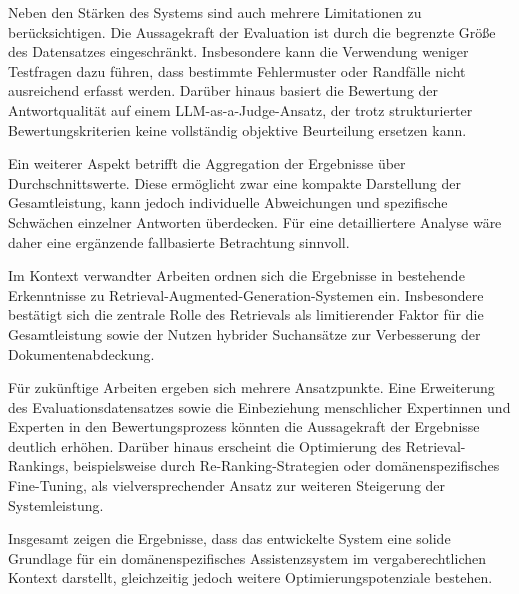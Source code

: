 Neben den Stärken des Systems sind auch mehrere Limitationen zu berücksichtigen. Die Aussagekraft der Evaluation ist durch die begrenzte Größe des Datensatzes eingeschränkt. Insbesondere kann die Verwendung weniger Testfragen dazu führen, dass bestimmte Fehlermuster oder Randfälle nicht ausreichend erfasst werden. Darüber hinaus basiert die Bewertung der Antwortqualität auf einem LLM-as-a-Judge-Ansatz, der trotz strukturierter Bewertungskriterien keine vollständig objektive Beurteilung ersetzen kann.

Ein weiterer Aspekt betrifft die Aggregation der Ergebnisse über Durchschnittswerte. Diese ermöglicht zwar eine kompakte Darstellung der Gesamtleistung, kann jedoch individuelle Abweichungen und spezifische Schwächen einzelner Antworten überdecken. Für eine detailliertere Analyse wäre daher eine ergänzende fallbasierte Betrachtung sinnvoll.

Im Kontext verwandter Arbeiten ordnen sich die Ergebnisse in bestehende Erkenntnisse zu Retrieval-Augmented-Generation-Systemen ein. Insbesondere bestätigt sich die zentrale Rolle des Retrievals als limitierender Faktor für die Gesamtleistung sowie der Nutzen hybrider Suchansätze zur Verbesserung der Dokumentenabdeckung.

Für zukünftige Arbeiten ergeben sich mehrere Ansatzpunkte. Eine Erweiterung des Evaluationsdatensatzes sowie die Einbeziehung menschlicher Expertinnen und Experten in den Bewertungsprozess könnten die Aussagekraft der Ergebnisse deutlich erhöhen. Darüber hinaus erscheint die Optimierung des Retrieval-Rankings, beispielsweise durch Re-Ranking-Strategien oder domänenspezifisches Fine-Tuning, als vielversprechender Ansatz zur weiteren Steigerung der Systemleistung.

Insgesamt zeigen die Ergebnisse, dass das entwickelte System eine solide Grundlage für ein domänenspezifisches Assistenzsystem im vergaberechtlichen Kontext darstellt, gleichzeitig jedoch weitere Optimierungspotenziale bestehen.
\clearpage